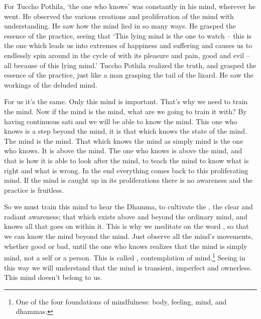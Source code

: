 For Tuccho Pothila, `the one who knows' was constantly in his mind, wherever he went. He observed the various creations and proliferation of the mind with understanding. He saw how the mind lied in so many ways. He grasped the essence of the practice, seeing that `This lying mind is the one to watch -- this is the one which leads us into extremes of happiness and suffering and causes us to endlessly spin around in the cycle of  with its pleasure and pain, good and evil -- all because of this lying mind.' Tuccho Pothila realized the truth, and grasped the essence of the practice, just like a man grasping the tail of the lizard. He saw the workings of the deluded mind. 

For us it's the same. Only this mind is important. That's why we need to train the mind. Now if the mind is the mind, what are we going to train it with? By having continuous sati and  we will be able to know the mind. This one who knows is a step beyond the mind, it is that which knows the state of the mind. The mind is the mind. That which knows the mind as simply mind is the one who knows. It is above the mind. The one who knows is above the mind, and that is how it is able to look after the mind, to teach the mind to know what is right and what is wrong. In the end everything comes back to this proliferating mind. If the mind is caught up in its proliferations there is no awareness and the practice is fruitless. 

So we must train this mind to hear the Dhamma, to cultivate the , the clear and radiant awareness; that which exists above and beyond the ordinary mind, and knows all that goes on within it. This is why we meditate on the word , so that we can know the mind beyond the mind. Just observe all the mind's movements, whether good or bad, until the one who knows realizes that the mind is simply mind, not a self or a person. This is called , contemplation of mind.\footnote{One of the four foundations of mindfulness: body, feeling, mind, and dhammas.} Seeing in this way we will understand that the mind is transient, imperfect and ownerless. This mind doesn't belong to us. 


